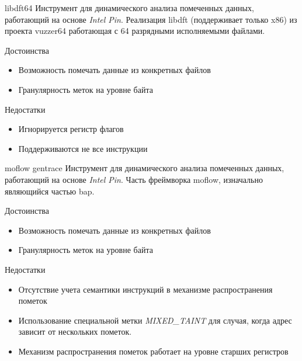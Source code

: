 \documentclass[10pt]{beamer}
\begin{document}
\begin{frame}{libdft64}
    Инструмент для динамического анализа помеченных данных, работающий на основе \emph{Intel Pin}. Реализация libdft (поддерживает только x86) из проекта vuzzer64 работающая с 64 разрядными исполняемыми файлами. 
    \begin{block}{Достоинства}
      \begin{itemize}
        \item Возможность помечать данные из конкретных файлов
        \item Гранулярность меток на уровне байта
      \end{itemize}
    \end{block}
        \begin{block}{Недостатки}
          \begin{itemize}
      \item Игнорируется регистр флагов
      \item Поддерживаются не все инструкции
      \end{itemize}
    \end{block}
\end{frame}


\begin{frame}{moflow gentrace}
    Инструмент для динамического анализа помеченных данных, работающий на основе \emph{Intel Pin}.
    Часть фреймворка moflow, изначально являющийся частью bap.
    \begin{block}{Достоинства}
      \begin{itemize}
        \item Возможность помечать данные из конкретных файлов
        \item Гранулярность меток на уровне байта
      \end{itemize}
    \end{block}
        \begin{block}{Недостатки}
          \begin{itemize}
      \item Отсутствие учета семантики инструкций в механизме распространения пометок
      \item Использование специальной метки \emph{MIXED\_TAINT} для случая, когда адрес зависит от нескольких пометок.
      \item Механизм распространения пометок работает на уровне старших регистров
      \end{itemize}
    \end{block}
\end{frame}
\end{document}
